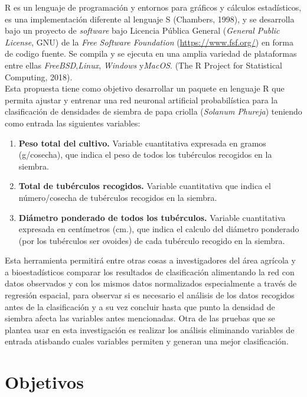 R es un lenguaje de programación y entornos para gráficos y c\'alculos estad\'isticos, es una implementación diferente al lenguaje S (Chambers, 1998), y se desarrolla bajo un proyecto de \textit{software} bajo Licencia Pública General (\textit{General Public License}, GNU) de la \textit{Free Software Foundation} (\url{https://www.fsf.org/}) en forma de codigo fuente. Se compila y se ejecuta en una amplia variedad de plataformas entre ellas \textit{FreeBSD},\textit{Linux}, \textit{Windows} y\textit{MacOS}. (The R Project for Statistical Computing, 2018).\\


Esta propuesta tiene como objetivo desarrollar un paquete en lenguaje R que permita ajustar y entrenar una red neuronal artificial probabil\'istica para la clasificación de densidades de siembra de papa criolla (\textit{Solanum Phureja}) teniendo como entrada las siguientes variables: 

\begin{enumerate}
    \item{\textbf{Peso total del cultivo.} Variable cuantitativa expresada en gramos (g/cosecha), que indica el peso de todos los tubérculos recogidos en la siembra.}
	\item{\textbf{Total de tubérculos recogidos.} Variable cuantitativa que indica el número/cosecha de tubérculos recogidos en la siembra.}
	\item{\textbf{Diámetro ponderado de todos los tubérculos.} Variable cuantitativa expresada en centímetros (cm.), que indica el calculo del diámetro ponderado (por los tubérculos ser ovoides) de cada tubérculo recogido en la siembra.}
\end{enumerate}


Esta herramienta permitirá entre otras cosas a investigadores del área agrícola y a bioestadísticos comparar los resultados de clasificación alimentando la red con datos observados y con los mismos datos normalizados especialmente a través de regresión espacial, para observar si es necesario el análisis de los datos recogidos antes de la clasificación y a su vez concluir hasta que punto la densidad de siembra afecta las variables antes mencionadas. Otra de las pruebas que se plantea usar en esta investigación es realizar los análisis eliminando variables de entrada atisbando cuales variables permiten y generan una mejor clasificación.\\

\section{Objetivos}

